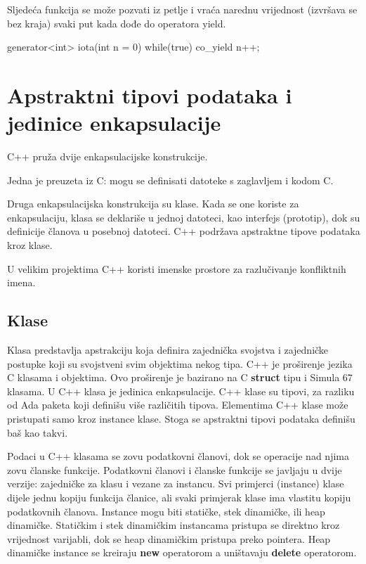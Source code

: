\documentclass[11pt]{book}
\begin{document}
Sljedeća funkcija se može pozvati iz petlje i vraća narednu vrijednost (izvršava se bez kraja) svaki put kada dođe do operatora yield.
\begin{shortlisting}
  generator<int> iota(int n = 0) {
      while(true)
      co_yield n++;
    }
\end{shortlisting}

\section{Apstraktni tipovi podataka i jedinice enkapsulacije}
C++ pruža dvije enkapsulacijske konstrukcije.

Jedna je preuzeta iz C: mogu se definisati datoteke s zaglavljem i kodom C.

Druga enkapsulacijska konstrukcija su klase. Kada se one koriste za enkapsulaciju, klasa se deklariše  u  jednoj  datoteci,  kao  interfejs  (prototip),  dok  su  definicije  članova  u  posebnoj datoteci. C++ podržava apstraktne tipove podataka kroz klase.

U velikim projektima C++ koristi imenske prostore za razlučivanje konfliktnih imena.

\subsection{Klase}

Klasa  predstavlja  apstrakciju  koja  definira  zajednička  svojstva i zajedničke postupke koji su svojstveni svim objektima nekog tipa. C++ je proširenje jezika C klasama i objektima. Ovo proširenje je bazirano na C \textbf{struct} tipu i Simula 67 klasama. U C++ klasa je jedinica enkapsulacije. C++ klase su tipovi, za razliku od Ada paketa koji definišu više različitih tipova. Elementima C++ klase može pristupati samo kroz instance klase. Stoga se apstraktni tipovi podataka definišu baš kao takvi.

Podaci u C++ klasama se zovu podatkovni članovi, dok se operacije nad njima zovu članske funkcije. Podatkovni članovi i članske funkcije se javljaju u dvije verzije: zajedničke za klasu i vezane za instancu. Svi primjerci (instance) klase dijele jednu kopiju funkcija članice, ali svaki primjerak klase ima vlastitu kopiju podatkovnih članova.  Instance mogu biti statičke, stek dinamičke, ili heap dinamičke. Statičkim i stek dinamičkim instancama  pristupa se direktno kroz  vrijednost varijabli,  dok  se  heap  dinamičkim  pristupa preko  pointera.  Heap  dinamičke  instance  se  kreiraju  \textbf{new}  operatorom  a  uništavaju  \textbf{delete} operatorom.
\end{document}
